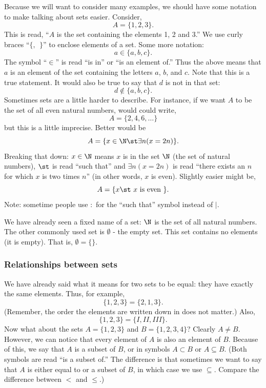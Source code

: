 Because we will want to consider many examples, we should have some notation to make talking about sets easier.  Consider,
\[ A = \{1, 2, 3\}.\]
This is read, ``$A$ is the set containing the elements 1, 2 and 3.''  We use curly braces ``$\{,~~ \}$'' to enclose elements of a set.  Some more notation:
\[ a \in \{a, b, c\}. \]
The symbol ``$\in$'' is read ``is in'' or ``is an element of.''  Thus the above means that $a$ is an element of the set containing the letters $a$, $b$, and $c$.  Note that this is a true statement.  It would also be true to say that $d$ is not in that set:
\[ d \not\in \{a, b, c\}.\]
Sometimes sets are a little harder to describe.  For instance, if we want $A$ to be the set of all even natural numbers, would could write,
\[ A = \{2, 4, 6, \ldots\}\]
but this is a little imprecise.  Better would be
\[ A = \{x \in \N \st \exists n ( x = 2 n)\}.\]
Breaking that down: $x \in \N$ means $x$ is in the set $\N$ (the set of natural numbers), $\st$ is read ``such that'' and $\exists n (x = 2n)$ is read ``there exists an $n$ for which $x$ is two times $n$'' (in other words, $x$ is even).  Slightly easier might be,
\[ A = \{x \st \mbox{ $x$ is even }\}. \]
Note: sometime people use $:$ for the ``such that'' symbol instead of $|$.

We have already seen a fixed name of a set: $\N$ is the set of all natural numbers.  The other commonly used set is $\emptyset$ - the empty set.  This set contains no elements (it is empty).  That is, $\emptyset = \{ \}$.

\subsubsection*{Relationships between sets}

We have already said what it means for two sets to be equal: they have exactly the same elements.  Thus, for example,
\[ \{1, 2, 3\} = \{2, 1, 3\}.\]
(Remember, the order the elements are written down in does not matter.)  Also,
\[ \{1, 2, 3\} = \{I, II, III\}.\]
Now what about the sets $A = \{1, 2, 3\}$ and $B = \{1, 2, 3, 4\}$?  Clearly $A \ne B$.  However, we can notice that every element of $A$ is also an element of $B$.  Because of this, we say that $A$ is a subset of $B$, or in symbols $A \subset B$ or $A \subseteq B$.  (Both symbols are read ``is a subset of.'' The difference is that sometimes we want to say that $A$ is either equal to or a subset of $B$, in which case we use $\subseteq$.  Compare the difference between $<$ and $\le$.)

